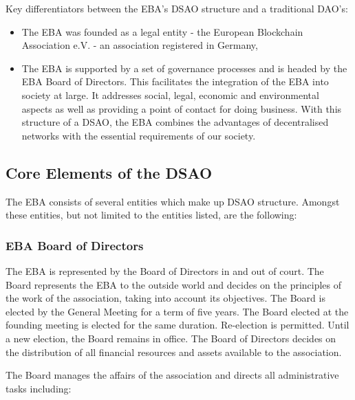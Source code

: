 \documentclass{article}
\begin{document}
Key differentiators between the EBA’s DSAO structure and a traditional DAO's:

\begin{itemize}
	\item {The EBA was founded as a legal entity - the European Blockchain Association e.V. - an association registered in Germany,}
	\item {The EBA is supported by a set of governance processes and is headed by the EBA Board of Directors. This facilitates the integration of the EBA into society at large. 
	It  addresses social, legal, economic and environmental aspects  as well as providing a point of contact for doing business. With this structure of a DSAO, the EBA combines the advantages of decentralised networks with the essential requirements of our society.}
\end{itemize}

\subsection{Core Elements of the DSAO}

The EBA consists of several entities which make up DSAO structure. Amongst these entities, but not limited to the entities listed, are the following:

\subsubsection{EBA Board of Directors}

The EBA is represented by the Board of Directors in and out of court. 
The Board represents the EBA to the outside world and decides on the principles of the work of the association, taking into account its objectives. The Board is elected by the General Meeting for a term of five years. 
The Board elected at the founding meeting is elected for the same duration. 
Re-election is permitted. 
Until a new election, the Board remains in office. 
The Board of Directors decides on the distribution of all financial resources and assets available to the association.

The Board manages the affairs of the association and directs all administrative tasks including:
\end{document}
